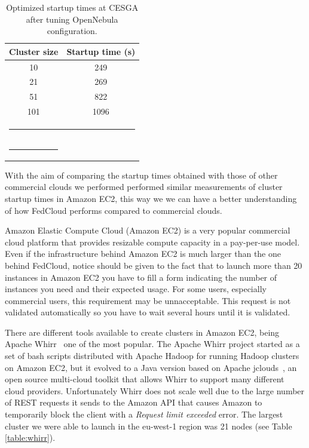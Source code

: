 \begin{table}[h!]
\caption{Optimized startup times at CESGA after tuning OpenNebula configuration.}
\label{table:startupON}
%
\vspace{-0.5em}
%
\begin{center}
\begin{tabular}{cc}
\toprule
Cluster size			& Startup time (s)  \\
\midrule
10                		& 249   	\\
21                   		& 269	      	\\
51                   		& 822 	    	\\
101                  		& 1096		\\
%
\bottomrule
\multicolumn{2}{c}{\rule{0.98\textwidth}{0em}}\\
\rule{0.5\textwidth}{0cm} &   \\
\end{tabular}
\end{center}
\end{table}



With the aim of comparing the startup times obtained with those of other commercial clouds we performed performed similar measurements of cluster startup times in Amazon EC2, this way we we can have a better understanding of how FedCloud performs compared to commercial clouds.

Amazon Elastic Compute Cloud (Amazon EC2) is a very popular commercial cloud platform that provides resizable compute capacity in a pay-per-use model. Even if the infrastructure behind Amazon EC2 is much larger than the one behind FedCloud, notice should be given to the fact that to launch more than 20 instances in Amazon EC2 you have to fill a form indicating the number of instances you need and their expected usage. For some users, especially commercial users, this requirement may be unnacceptable. This request is not validated automatically so you have to wait several hours until it is validated.
 
There are different tools available to create clusters in Amazon EC2, being Apache Whirr~\cite{whirr} one of the most popular. The Apache Whirr project started as a set of bash scripts distributed with Apache Hadoop for running Hadoop clusters on Amazon EC2, but it evolved to a Java version based on Apache jclouds~\cite{jclouds}, an open source multi-cloud toolkit that allows Whirr to support many different cloud providers. 
Unfortunately Whirr does not scale well due to the large number of REST requests it sends to the Amazon API that causes Amazon to temporarily block the client with a \emph{Request limit exceeded} error. The largest cluster we were able to launch in the eu-west-1 region was 21 nodes (see Table \ref{table:whirr}).

